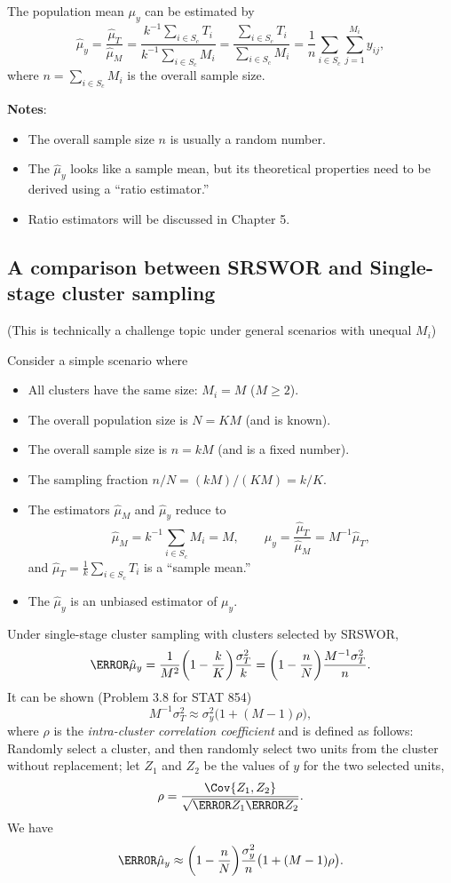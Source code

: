 The population mean $ \mu_y $ can be estimated by
\[ \hat{\mu}_y=\frac{\hat{\mu}_T}{\hat{\mu}_M}=\frac{k^{-1}\sum_{i\in S_c}T_i}{k^{-1}\sum_{i\in S_c}M_i}
      =\frac{\sum_{i\in S_c}T_i}{\sum_{i\in S_c}M_i}=\frac{1}{n}\sum_{i\in S_c}\sum_{j=1}^{M_i}y_{ij}, \]
where $ n=\sum_{i\in S_c}M_i $ is the overall sample size.

\textbf{Notes}:
\begin{itemize}
      \item The overall sample size $ n $ is usually a random number.
      \item The $ \hat{\mu}_y $ looks like a sample mean, but its theoretical properties need to
            be derived using a ``ratio estimator.''
      \item Ratio estimators will be discussed in Chapter 5.
\end{itemize}

\subsection{A comparison between SRSWOR and Single-stage cluster sampling}

(This is technically a challenge topic under general scenarios with
unequal $ M_i $)

Consider a simple scenario where
\begin{itemize}
      \item All clusters have the same size: $ M_i=M $ ($ M\ge 2 $).
      \item The overall population size is $ N=KM $ (and is known).
      \item The overall sample size is $ n=kM $ (and is a fixed number).
      \item The sampling fraction $ n/N=(kM)/(KM)=k/K $.
      \item The estimators $ \hat{\mu}_M $ and $ \hat{\mu}_y $ reduce to
            \[ \hat{\mu}_M=k^{-1}\sum_{i\in S_c}M_i=M,\qquad \hat{\mu}_y=\frac{\hat{\mu}_T}{\hat{\mu}_M}=M^{-1}\hat{\mu}_T, \]
            and $ \hat{\mu}_T=\frac{1}{k}\sum_{i\in S_c}T_i $ is a ``sample mean.''
      \item The $ \hat{\mu}_y $ is an unbiased estimator of $ \mu_y $.
\end{itemize}

Under single-stage cluster sampling with clusters selected by
SRSWOR,
\[ \V{\hat{\mu}_y}=\frac{1}{M^2}\biggl(1-\frac{k}{K}\biggr)\frac{\sigma_T^2}{k}=\biggl(1-\frac{n}{N}\biggr)\frac{M^{-1}\sigma_T^2}{n}. \]
It can be shown (Problem 3.8 for STAT 854)
\[ M^{-1}\sigma_T^2\approx \sigma_y^2\bigl(1+(M-1)\rho\bigr), \]
where $ \rho $ is the \emph{intra-cluster correlation coefficient}
and is defined as follows: Randomly select a cluster, and then randomly select two units
from the cluster without replacement; let $ Z_1 $ and $ Z_2 $ be the
values of $ y $ for the two selected units,
\[ \rho=\frac{\Cov{Z_1,Z_2}}{\sqrt{\V{Z_1}\V{Z_2}}}. \]
We have
\[ \V{\hat{\mu}_y}\approx \biggl(1-\frac{n}{N}\biggr)\frac{\sigma_y^2}{n}\bigl(1+(M-1)\rho\bigr). \]

